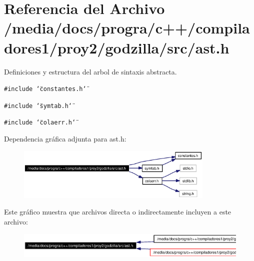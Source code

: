 \section{Referencia del Archivo /media/docs/progra/c++/compiladores1/proy2/godzilla/src/ast.h}
\label{ast_8h}
Definiciones y estructura del arbol de sintaxis abstracta. 

{\tt \#include \char`\"{}constantes.h\char`\"{}}\par
{\tt \#include \char`\"{}symtab.h\char`\"{}}\par
{\tt \#include \char`\"{}colaerr.h\char`\"{}}\par


Dependencia gr\'{a}fica adjunta para ast.h:\begin{figure}[H]
\begin{center}
\leavevmode
\includegraphics[width=268pt]{ast_8h__incl}
\end{center}
\end{figure}


Este gr\'{a}fico muestra que archivos directa o indirectamente incluyen a este archivo:\begin{figure}[H]
\begin{center}
\leavevmode
\includegraphics[width=342pt]{ast_8h__dep__incl}
\end{center}
\end{figure}
